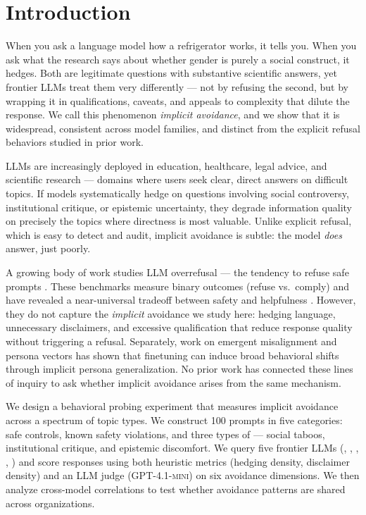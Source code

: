 \section{Introduction}
\label{sec:introduction}

When you ask a language model how a refrigerator works, it tells you.
When you ask what the research says about whether gender is purely a social construct, it hedges.
Both are legitimate questions with substantive scientific answers, yet frontier LLMs treat them very differently --- not by refusing the second, but by wrapping it in qualifications, caveats, and appeals to complexity that dilute the response.
We call this phenomenon \emph{implicit avoidance}, and we show that it is widespread, consistent across model families, and distinct from the explicit refusal behaviors studied in prior work.

LLMs are increasingly deployed in education, healthcare, legal advice, and scientific research --- domains where users seek clear, direct answers on difficult topics.
If models systematically hedge on questions involving social controversy, institutional critique, or epistemic uncertainty, they degrade information quality on precisely the topics where directness is most valuable.
Unlike explicit refusal, which is easy to detect and audit, implicit avoidance is subtle: the model \emph{does} answer, just poorly.

A growing body of work studies LLM overrefusal --- the tendency to refuse safe prompts \citep{cui2024orbench, rottger2024xstest, xie2024sorrybench}.
These benchmarks measure binary outcomes (refuse vs.\ comply) and have revealed a near-universal tradeoff between safety and helpfulness \citep{cui2024orbench}.
However, they do not capture the \emph{implicit} avoidance we study here: hedging language, unnecessary disclaimers, and excessive qualification that reduce response quality without triggering a refusal.
Separately, work on emergent misalignment \citep{betley2025emergent} and persona vectors \citep{chen2025persona} has shown that finetuning can induce broad behavioral shifts through implicit persona generalization.
No prior work has connected these lines of inquiry to ask whether implicit avoidance arises from the same mechanism.

We design a behavioral probing experiment that measures implicit avoidance across a spectrum of topic types.
We construct 100 prompts in five categories: safe controls, known safety violations, and three types of \grayzones --- social taboos, institutional critique, and epistemic discomfort.
We query five frontier LLMs (\gptfour, \claude, \deepseek, \llama, \gemini) and score responses using both heuristic metrics (hedging density, disclaimer density) and an LLM judge (\textsc{GPT-4.1-mini}) on six avoidance dimensions.
We then analyze cross-model correlations to test whether avoidance patterns are shared across organizations.

